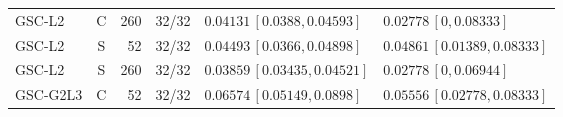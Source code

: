 \documentclass[10pt,a4paper]{article}
\begin{document}
\begin{longtable}{lcrcp{44mm}p{44mm}}
GSC-L2 & C & 260 & 32/32 & \(0.04131\,[0.0388,0.04593]\) & \(0.02778\,[0,0.08333]\)\\
GSC-L2 & S & 52 & 32/32 & \(0.04493\,[0.0366,0.04898]\) & \(0.04861\,[0.01389,0.08333]\)\\
GSC-L2 & S & 260 & 32/32 & \(0.03859\,[0.03435,0.04521]\) & \(0.02778\,[0,0.06944]\)\\
GSC-G2L3 & C & 52 & 32/32 & \(0.06574\,[0.05149,0.0898]\) & \(0.05556\,[0.02778,0.08333]\)\\

\end{longtable}
\end{document}
